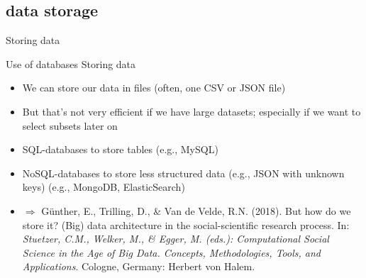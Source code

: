 \documentclass[handout]{beamer}
\begin{document}
\subsection{data storage}
\begin{frame}{Storing data}
\begin{block}{Use of databases}
	Storing data
	\begin{itemize}
		\item We can store our data in files (often, one CSV or JSON file)
		\item But that's not very efficient if we have large datasets; especially if we want to select subsets later on
		\item SQL-databases to store tables (e.g., MySQL)
		\item NoSQL-databases to store less structured data (e.g., JSON with unknown keys) (e.g., MongoDB, ElasticSearch)
		\item $\Rightarrow$ \tiny{Günther, E., Trilling, D., \& Van de Velde, R.N. (2018). But how do we store it? (Big) data architecture in the social-scientific research process. In:\textit{ Stuetzer, C.M., Welker, M., \& Egger, M. (eds.): Computational Social Science in the Age of Big Data. Concepts, Methodologies, Tools, and Applications}. Cologne, Germany: Herbert von Halem.}
	\end{itemize}
\end{block}
\end{frame}
\end{document}
